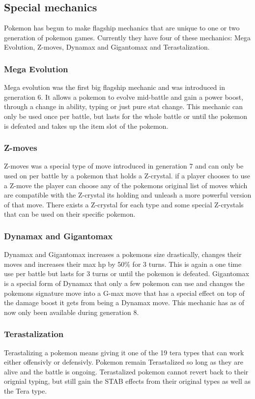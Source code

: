 \subsection{Special mechanics}
Pokemon has begun to make flagship mechanics that are unique to one or two generation of pokemon games.
Currently they have four of these mechanics: Mega Evolution, Z-moves, Dynamax and Gigantomax and Terastalization.
\subsubsection{Mega Evolution}
Mega evolution was the first big flagship mechanic and was introduced in generation 6. It allows a pokemon to evolve mid-battle and gain a 
power boost, through a change in ability, typing or just pure stat change. This mechanic can only be used once per battle, but lasts for the whole battle
or until the pokemon is defeated and takes up the item slot of the pokemon.\cite{MegaEvolution}
\subsubsection{Z-moves}
Z-moves was a special type of move introduced in generation 7 and can only be used on per battle by a pokemon that holds a Z-crystal. if a player chooses to 
use a Z-move the player can choose any of the pokemons original list of moves which are compatible with the Z-crystal its holding and unleash a more powerful
version of that move. There exists a Z-crystal for each type and some special Z-crystals that can be used on their specific pokemon. \cite{Zmoves}
\subsubsection{Dynamax and Gigantomax}
Dynamax and Gigantomax increases a pokemons size drastically, changes their moves and increases their max hp by 50\% for 3 turns. This is again a one time
use per battle but lasts for 3 turns or until the pokemon is defeated. Gigantomax is a special form of Dynamax that only a few pokemon can use and 
changes the pokemons signature move into a G-max move that has a special effect on top of the damage boost it gets from being a Dynamax move.
This mechanic has as of now only been available during generation 8. \cite{Dynamax}
\subsubsection{Terastalization}
Terastalizing a pokemon means giving it one of the 19 tera types that can work either offensivly or defensivly. Pokemon remain Terastalized so long 
as they are alive and the battle is ongoing. Terastalized pokemon cannot revert back to their orignial typing, but still gain the STAB effects 
from their original types as well as the Tera type. \cite{TeraType}